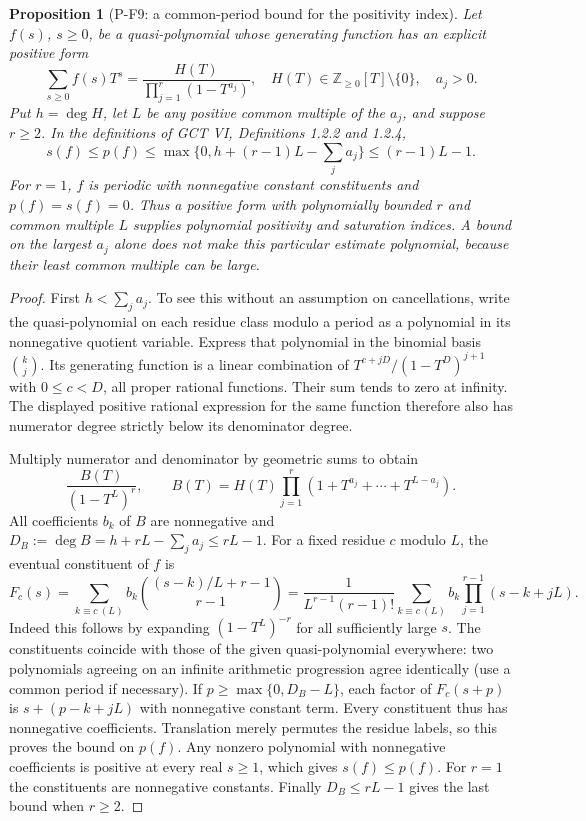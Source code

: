 \documentclass[11pt,a4paper]{article}
\newtheorem{proposition}{Proposition}[section]
\begin{document}
\begin{proposition}[P-F9: a common-period bound for the positivity index]
\label{prop:periodbound}
Let $f(s)$, $s\ge0$, be a quasi-polynomial whose generating function has
an explicit positive form
\[
 \sum_{s\ge0}f(s)T^s=\frac{H(T)}{\prod_{j=1}^r(1-T^{a_j})},
 \quad H(T)\in\mathbb Z_{\ge0}[T]\setminus\{0\},\quad a_j>0.
\]
Put $h=\deg H$, let $L$ be any positive common multiple of the $a_j$, and suppose
$r\ge2$. In the definitions of GCT VI, Definitions 1.2.2 and 1.2.4,
\[
 s(f)\le p(f)\le
 \max\{0,h+(r-1)L-\textstyle\sum_j a_j\}
 \le (r-1)L-1.
 \tag{P-F9}
\]
For $r=1$, $f$ is periodic with nonnegative constant constituents and
$p(f)=s(f)=0$. Thus a positive form with polynomially bounded $r$ and
common multiple $L$ supplies polynomial positivity and saturation
indices. A bound on the largest $a_j$ alone does not make this particular
estimate polynomial, because their least common multiple can be large.
\end{proposition}
\begin{proof}
First $h<\sum_j a_j$. To see this without an assumption on cancellations,
write the quasi-polynomial on each residue class modulo a period as a
polynomial in its nonnegative quotient variable. Express that polynomial
in the binomial basis $\binom{k}{j}$. Its generating function is a linear
combination of $T^{c+jD}/(1-T^D)^{j+1}$ with $0\le c<D$, all proper
rational functions. Their sum tends to zero at infinity. The displayed
positive rational expression for the same function therefore also has
numerator degree strictly below its denominator degree.

Multiply numerator and denominator by geometric sums to obtain
\[
 \frac{B(T)}{(1-T^L)^r},\qquad
 B(T)=H(T)\prod_{j=1}^r
       (1+T^{a_j}+\cdots+T^{L-a_j}).
\]
All coefficients $b_k$ of $B$ are nonnegative and
$D_B:=\deg B=h+rL-\sum_j a_j\le rL-1$.
For a fixed residue $c$ modulo $L$, the eventual constituent of $f$ is
\[
 F_c(s)=\sum_{k\equiv c\ (L)} b_k
 \binom{(s-k)/L+r-1}{r-1}
 =\frac1{L^{r-1}(r-1)!}
 \sum_{k\equiv c\ (L)} b_k
 \prod_{j=1}^{r-1}(s-k+jL).
\]
Indeed this follows by expanding $(1-T^L)^{-r}$ for all sufficiently
large $s$. The constituents coincide with those of the given
quasi-polynomial everywhere: two polynomials agreeing on an infinite
arithmetic progression agree identically (use a common period if
necessary). If $p\ge\max\{0,D_B-L\}$, each factor of $F_c(s+p)$ is
$s+(p-k+jL)$ with nonnegative constant term. Every constituent thus has
nonnegative coefficients. Translation merely permutes the residue
labels, so this proves the bound on $p(f)$. Any nonzero polynomial with
nonnegative coefficients is positive at every real $s\ge1$, which gives
$s(f)\le p(f)$. For $r=1$ the constituents are nonnegative constants.
Finally $D_B\le rL-1$ gives the last bound when $r\ge2$.
\end{proof}
\end{document}
